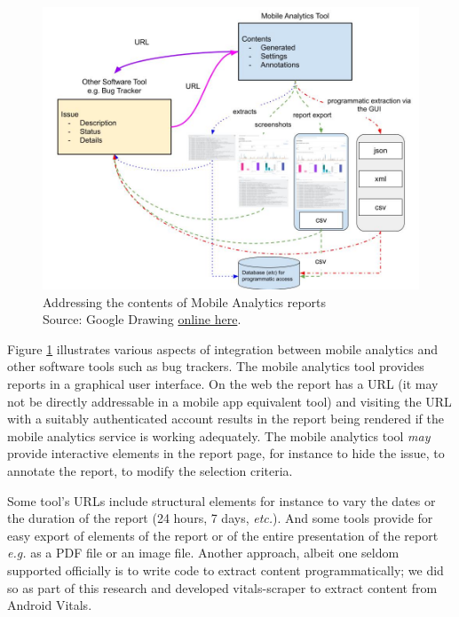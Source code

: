 \begin{figure}
    \centering
    \includegraphics[width=\textwidth]{images/rough-sketches/integration-of-mobile-analytics-tool.jpeg}
    \caption[Addressing the contents of Mobile Analytics reports]{Addressing the contents of Mobile Analytics reports\\Source: Google Drawing \href{https://docs.google.com/drawings/d/1y7QP8UK7ugl0DzWIeH4udRxwsVMHjyQ6Am0qW6glkdE/edit?usp=sharing}{online here}.}
    \label{fig:addressing-the-contents-of-mobile-analytics}
\end{figure}

Figure \ref{fig:addressing-the-contents-of-mobile-analytics} illustrates various aspects of integration between mobile analytics and other software tools such as bug trackers. The mobile analytics tool provides reports in a graphical user interface. On the web the report has a URL (it may not be directly addressable in a mobile app equivalent tool) and visiting the URL with a suitably authenticated account results in the report being rendered if the mobile analytics service is working adequately. The mobile analytics tool \emph{may} provide interactive elements in the report page, for instance to hide the issue, to annotate the report, to modify the selection criteria. 

Some tool's URLs include structural elements for instance to vary the dates or the duration of the report (24 hours, 7 days, \emph{etc.}). And some tools provide for easy export of elements of the report or of the entire presentation of the report \emph{e.g.} as a PDF file or an image file. Another approach, albeit one seldom supported officially is to write code to extract content programmatically; we did so as part of this research and developed vitals-scraper to extract content from Android Vitals. 

